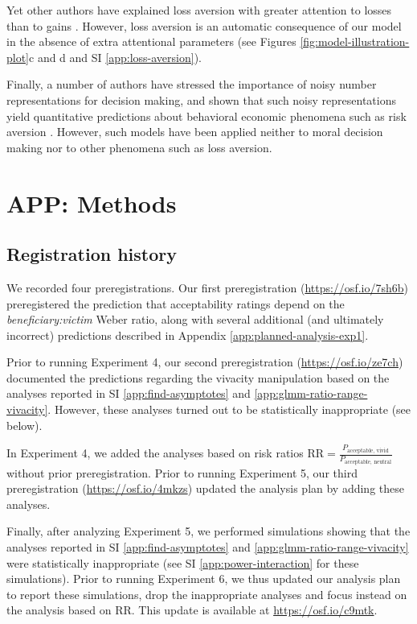 \documentclass[
]{article}
\begin{document}
Yet other authors have explained loss aversion with greater attention to losses than to gains \autocite{Yechiam2013}. However, loss aversion is an automatic consequence of our model in the absence of extra attentional parameters (see Figures \ref{fig:model-illustration-plot}c and d and SI \ref{app:loss-aversion}).

Finally, a number of authors have stressed the importance of noisy number representations for decision making, and shown that such noisy representations yield quantitative predictions about behavioral economic phenomena such as risk aversion \autocite{Woodford2020,Khaw2020,BarrettoGarcia2023}. However, such models have been applied neither to moral decision making nor to other phenomena such as loss aversion.

\clearpage

\section{APP: Methods}\label{app:methods}

\subsection{Registration history}\label{app:preregistrations}

We recorded four preregistrations. Our first preregistration (\url{https://osf.io/7sh6b}) preregistered the prediction that acceptability ratings depend on the \emph{beneficiary:victim} Weber ratio, along with several additional (and ultimately incorrect) predictions described in Appendix \ref{app:planned-analysis-exp1}.

Prior to running Experiment 4, our second preregistration (\url{https://osf.io/ze7ch}) documented the predictions regarding the vivacity manipulation based on the analyses reported in SI \ref{app:find-asymptotes} and \ref{app:glmm-ratio-range-vivacity}. However, these analyses turned out to be statistically inappropriate (see below).

In Experiment 4, we added the analyses based on risk ratios \(\mathrm{RR}= \frac{P_{\text{acceptable, vivid}}}{P_{\text{acceptable, neutral}}}\) without prior preregistration. Prior to running Experiment 5, our third preregistration (\url{https://osf.io/4mkzs}) updated the analysis plan by adding these analyses.

Finally, after analyzing Experiment 5, we performed simulations showing that the analyses reported in SI \ref{app:find-asymptotes} and \ref{app:glmm-ratio-range-vivacity} were statistically inappropriate (see SI \ref{app:power-interaction} for these simulations). Prior to running Experiment 6, we thus updated our analysis plan to report these simulations, drop the inappropriate analyses and focus instead on the analysis based on \(\mathrm{RR}\). This update is available at \url{https://osf.io/c9mtk}.
\end{document}
